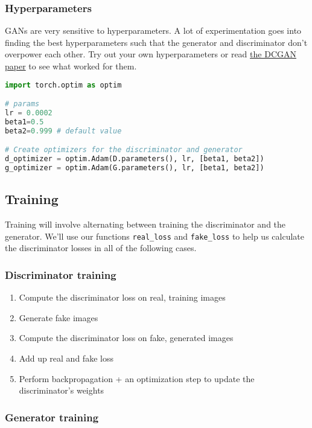 \subsubsection{Hyperparameters}

GANs are very sensitive to hyperparameters. A lot of experimentation
goes into finding the best hyperparameters such that the generator and
discriminator don't overpower each other. Try out your own
hyperparameters or read \href{https://arxiv.org/pdf/1511.06434.pdf}{the
DCGAN paper} to see what worked for them.

\begin{lstlisting}[language=Python]
import torch.optim as optim

# params
lr = 0.0002
beta1=0.5
beta2=0.999 # default value

# Create optimizers for the discriminator and generator
d_optimizer = optim.Adam(D.parameters(), lr, [beta1, beta2])
g_optimizer = optim.Adam(G.parameters(), lr, [beta1, beta2])
\end{lstlisting}

\subsection{Training}

Training will involve alternating between training the discriminator and
the generator. We'll use our functions
\lstinline{real_loss} and
\lstinline{fake_loss} to help us calculate the
discriminator losses in all of the following cases.

\subsubsection{Discriminator training}

\begin{enumerate}
\item Compute the discriminator loss on real, training images\\
\item Generate fake images
\item Compute the discriminator loss on fake, generated images\\
\item Add up real and fake loss
\item Perform backpropagation + an optimization step to update the discriminator's weights
\end{enumerate}

\subsubsection{Generator training}

